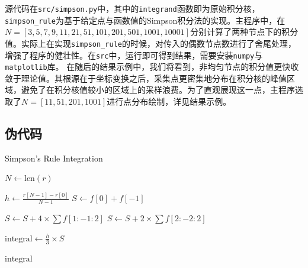 源代码在\texttt{src/simpson.py}中，其中的\texttt{integrand}函数即为原始积分核，\texttt{simpson\_rule}为基于给定点与函数值的Simpson积分法的实现。主程序中，在$N=[3, 5, 7, 9, 11, 21, 51, 101, 201, 501, 1001, 10001]$分别计算了两种节点下的积分值。实际上在实现\texttt{simpson\_rule}的时候，对传入的偶数节点数进行了舍尾处理，增强了程序的健壮性。在\texttt{src}中，运行即可得到结果，需要安装\texttt{numpy}与\texttt{matplotlib}库。
在随后的结果示例中，我们将看到，非均匀节点的积分值更快收敛于理论值。其根源在于坐标变换之后，采集点更密集地分布在积分核的峰值区域，避免了在积分核值较小的区域上的采样浪费。为了直观展现这一点，主程序选取了$N = [11, 51, 201, 1001]$进行点分布绘制，详见结果示例。
\subsection{伪代码}
\begin{algorithm}[H]
    \caption{Simpson's Rule Integration}
    
    $N \gets \text{len}(r)$ 
    
    $h \gets \frac{r[N-1] - r[0]}{N - 1}$\;
    $S \gets f[0] + f[-1]$ 
    
    $S \gets S + 4 \times \sum f[1 : -1 : 2]$ 
    $S \gets S + 2 \times \sum f[2 : -2 : 2]$ 
    
    $\text{integral} \gets \frac{h}{3} \times S$

    \KwRet $\text{integral}$
    \end{algorithm}
    
